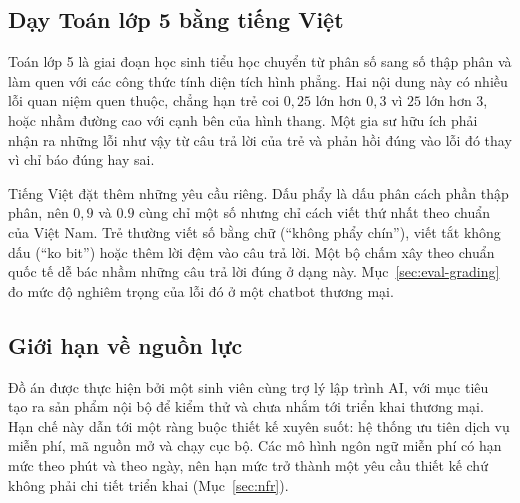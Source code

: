 \subsection{Dạy Toán lớp 5 bằng tiếng Việt}
Toán lớp 5 là giai đoạn học sinh tiểu học chuyển từ phân số sang số thập phân và làm quen với các công thức tính diện tích hình phẳng. Hai nội dung này có nhiều lỗi quan niệm quen thuộc, chẳng hạn trẻ coi $0{,}25$ lớn hơn $0{,}3$ vì $25$ lớn hơn $3$, hoặc nhầm đường cao với cạnh bên của hình thang. Một gia sư hữu ích phải nhận ra những lỗi như vậy từ câu trả lời của trẻ và phản hồi đúng vào lỗi đó thay vì chỉ báo đúng hay sai.

Tiếng Việt đặt thêm những yêu cầu riêng. Dấu phẩy là dấu phân cách phần thập phân, nên $0{,}9$ và $0.9$ cùng chỉ một số nhưng chỉ cách viết thứ nhất theo chuẩn của Việt Nam. Trẻ thường viết số bằng chữ (``không phẩy chín''), viết tắt không dấu (``ko bit'') hoặc thêm lời đệm vào câu trả lời. Một bộ chấm xây theo chuẩn quốc tế dễ bác nhầm những câu trả lời đúng ở dạng này. Mục~\ref{sec:eval-grading} đo mức độ nghiêm trọng của lỗi đó ở một chatbot thương mại.

\subsection{Giới hạn về nguồn lực}
Đồ án được thực hiện bởi một sinh viên cùng trợ lý lập trình AI, với mục tiêu tạo ra sản phẩm nội bộ để kiểm thử và chưa nhắm tới triển khai thương mại. Hạn chế này dẫn tới một ràng buộc thiết kế xuyên suốt: hệ thống ưu tiên dịch vụ miễn phí, mã nguồn mở và chạy cục bộ. Các mô hình ngôn ngữ miễn phí có hạn mức theo phút và theo ngày, nên hạn mức trở thành một yêu cầu thiết kế chứ không phải chi tiết triển khai (Mục~\ref{sec:nfr}).

